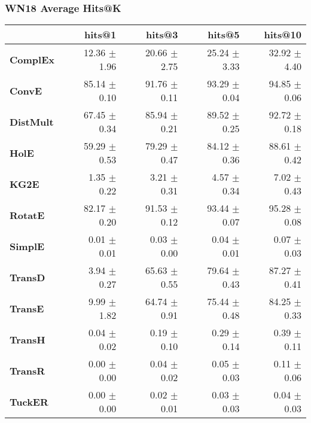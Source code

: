 \documentclass{article}
\begin{document}
\subsubsection{WN18 Average Hits@K}
    \begin{center}
    \begin{tabular}{lrrrr}
\toprule
{} &        hits@1 &        hits@3 &        hits@5 &       hits@10 \\
\midrule
\textbf{ComplEx } &  12.36 $\pm$ 1.96 &  20.66 $\pm$ 2.75 &  25.24 $\pm$ 3.33 &  32.92 $\pm$ 4.40 \\
\textbf{ConvE   } &  85.14 $\pm$ 0.10 &  91.76 $\pm$ 0.11 &  93.29 $\pm$ 0.04 &  94.85 $\pm$ 0.06 \\
\textbf{DistMult} &  67.45 $\pm$ 0.34 &  85.94 $\pm$ 0.21 &  89.52 $\pm$ 0.25 &  92.72 $\pm$ 0.18 \\
\textbf{HolE    } &  59.29 $\pm$ 0.53 &  79.29 $\pm$ 0.47 &  84.12 $\pm$ 0.36 &  88.61 $\pm$ 0.42 \\
\textbf{KG2E    } &  $\phantom{5}$1.35 $\pm$ 0.22 &  $\phantom{5}$3.21 $\pm$ 0.31 &  $\phantom{5}$4.57 $\pm$ 0.34 &  $\phantom{5}$7.02 $\pm$ 0.43 \\
\textbf{RotatE  } &  82.17 $\pm$ 0.20 &  91.53 $\pm$ 0.12 &  93.44 $\pm$ 0.07 &  95.28 $\pm$ 0.08 \\
\textbf{SimplE  } &  $\phantom{5}$0.01 $\pm$ 0.01 &  $\phantom{5}$0.03 $\pm$ 0.00 &  $\phantom{5}$0.04 $\pm$ 0.01 &  $\phantom{5}$0.07 $\pm$ 0.03 \\
\textbf{TransD  } &  $\phantom{5}$3.94 $\pm$ 0.27 &  65.63 $\pm$ 0.55 &  79.64 $\pm$ 0.43 &  87.27 $\pm$ 0.41 \\
\textbf{TransE  } &  $\phantom{5}$9.99 $\pm$ 1.82 &  64.74 $\pm$ 0.91 &  75.44 $\pm$ 0.48 &  84.25 $\pm$ 0.33 \\
\textbf{TransH  } &  $\phantom{5}$0.04 $\pm$ 0.02 &  $\phantom{5}$0.19 $\pm$ 0.10 &  $\phantom{5}$0.29 $\pm$ 0.14 &  $\phantom{5}$0.39 $\pm$ 0.11 \\
\textbf{TransR  } &  $\phantom{5}$0.00 $\pm$ 0.00 &  $\phantom{5}$0.04 $\pm$ 0.02 &  $\phantom{5}$0.05 $\pm$ 0.03 &  $\phantom{5}$0.11 $\pm$ 0.06 \\
\textbf{TuckER  } &  $\phantom{5}$0.00 $\pm$ 0.00 &  $\phantom{5}$0.02 $\pm$ 0.01 &  $\phantom{5}$0.03 $\pm$ 0.03 &  $\phantom{5}$0.04 $\pm$ 0.03 \\
\bottomrule
\end{tabular}

    \end{center}
\end{document}
